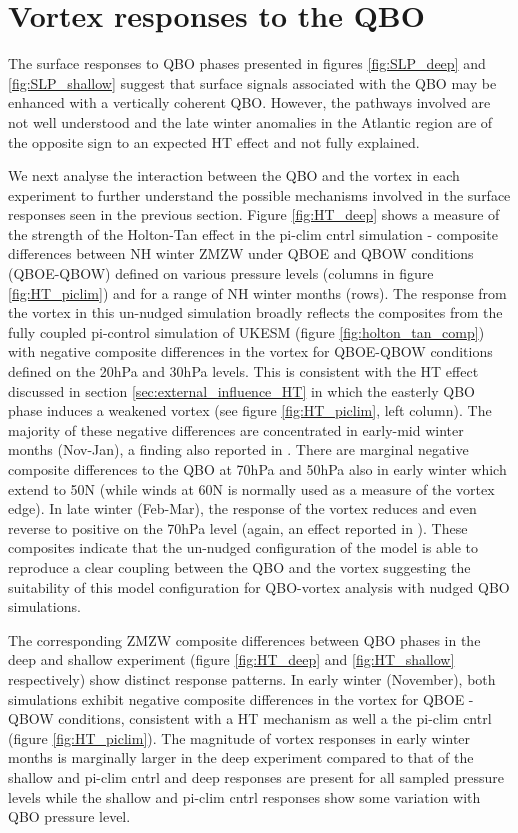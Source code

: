 \section{Vortex responses to the QBO}
The surface responses to QBO phases presented in figures \ref{fig:SLP_deep} and \ref{fig:SLP_shallow} suggest that surface signals associated with the QBO may be enhanced with a vertically coherent QBO. However, the pathways involved are not well understood and the late winter anomalies in the Atlantic region are of the opposite sign to an expected HT effect and not fully explained.

We next analyse the interaction between the QBO and the vortex in each experiment to further understand the possible mechanisms involved in the surface responses seen in the previous section. Figure \ref{fig:HT_deep} shows a measure of the strength of the Holton-Tan effect in the pi-clim cntrl simulation -  composite differences between NH winter ZMZW under QBOE and QBOW conditions (QBOE-QBOW) defined on various pressure levels (columns in figure \ref{fig:HT_piclim}) and for a range of NH winter months (rows). The response from the vortex in this un-nudged simulation broadly reflects the composites from the fully coupled pi-control simulation of UKESM (figure \ref{fig:holton_tan_comp}) with negative composite differences in the vortex for QBOE-QBOW conditions defined on the 20hPa and 30hPa levels. This is consistent with the HT effect discussed in section \ref{sec:external_influence_HT} in which the easterly QBO phase induces a weakened vortex (see figure \ref{fig:HT_piclim}, left column). The majority of these negative differences are concentrated in early-mid winter months (Nov-Jan), a finding also reported in \cite{graySurface2018b}. There are marginal negative composite differences to the QBO at 70hPa and 50hPa also in early winter which extend to 50N (while winds at 60N is normally used as a measure of the vortex edge). In late winter (Feb-Mar), the response of the vortex reduces and even reverse to positive on the 70hPa level (again, an effect reported in \cite{graySurface2018b}). These composites indicate that the un-nudged configuration of the model is able to reproduce a clear coupling between the QBO and the vortex suggesting the suitability of this model configuration for QBO-vortex analysis with nudged QBO simulations.

The corresponding ZMZW composite differences between QBO phases in the deep and shallow experiment (figure \ref{fig:HT_deep} and \ref{fig:HT_shallow} respectively) show distinct response patterns. In early winter (November), both simulations exhibit negative composite differences in the vortex for QBOE - QBOW conditions, consistent with a HT mechanism \citep{holtonNumerical1980} as well a the pi-clim cntrl (figure \ref{fig:HT_piclim}). The magnitude of vortex responses in early winter months is marginally larger in the deep experiment compared to that of the shallow and pi-clim cntrl and deep responses are present for all sampled pressure levels while the shallow and pi-clim cntrl responses show some variation with QBO pressure level. 

